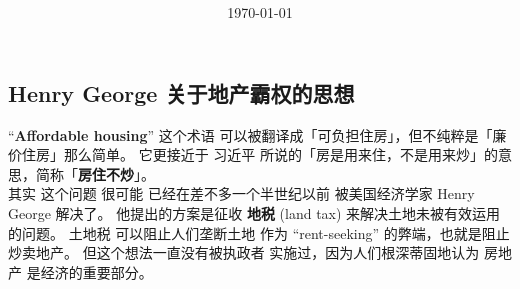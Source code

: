 \begin{preview}

\title{\vspace{-1cm} \bfseries{}}

\date{\vspace{-1.5cm} \small \today}

\maketitle


\setcounter{section}{-1}
\setcounter{mypage}{0}


\begin{minipage}{\textwidth}
\setlength{\parskip}{0pt}

\section{Henry George 关于地产霸权的思想}

``\textbf{Affordable housing}'' 这个术语 可以被翻译成「可负担住房」，但不纯粹是「廉价住房」那么简单。 它更接近于 习近平 所说的「房是用来住，不是用来炒」的意思，简称「\textbf{房住不炒}」。\\

其实 这个问题 很可能 已经在差不多一个半世纪以前 被美国经济学家 Henry George 解决了。 他提出的方案是征收 \textbf{地税} (land tax) 来解决土地未被有效运用的问题。 土地税 可以阻止人们垄断土地 作为 “rent-seeking” 的弊端，也就是阻止 炒卖地产。 但这个想法一直没有被执政者 实施过，因为人们根深蒂固地认为 房地产 是经济的重要部分。\\


\end{minipage}
\end{preview}
